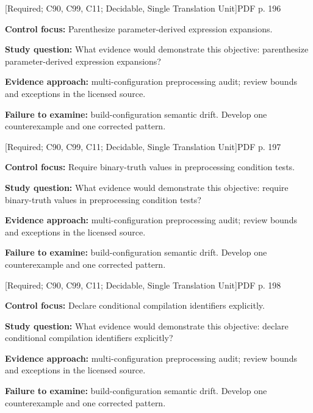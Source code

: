 \documentclass[10pt,letterpaper]{article}
\begin{document}
\smallskip
{}
 \textsf{\footnotesize [Required; C90, C99, C11; Decidable, Single Translation Unit]}\hfill{\footnotesize PDF p. 196}\par
\textbf{Control focus:} Parenthesize parameter-derived expression expansions.\par
\textbf{Study question:} What evidence would demonstrate this objective: parenthesize parameter-derived expression expansions?\par
\textbf{Evidence approach:} multi-configuration preprocessing audit; review bounds and exceptions in the licensed source.\par
\textbf{Failure to examine:} build-configuration semantic drift. Develop one counterexample and one corrected pattern.\par
\smallskip
{}
 \textsf{\footnotesize [Required; C90, C99, C11; Decidable, Single Translation Unit]}\hfill{\footnotesize PDF p. 197}\par
\textbf{Control focus:} Require binary-truth values in preprocessing condition tests.\par
\textbf{Study question:} What evidence would demonstrate this objective: require binary-truth values in preprocessing condition tests?\par
\textbf{Evidence approach:} multi-configuration preprocessing audit; review bounds and exceptions in the licensed source.\par
\textbf{Failure to examine:} build-configuration semantic drift. Develop one counterexample and one corrected pattern.\par
\smallskip
{}
 \textsf{\footnotesize [Required; C90, C99, C11; Decidable, Single Translation Unit]}\hfill{\footnotesize PDF p. 198}\par
\textbf{Control focus:} Declare conditional compilation identifiers explicitly.\par
\textbf{Study question:} What evidence would demonstrate this objective: declare conditional compilation identifiers explicitly?\par
\textbf{Evidence approach:} multi-configuration preprocessing audit; review bounds and exceptions in the licensed source.\par
\textbf{Failure to examine:} build-configuration semantic drift. Develop one counterexample and one corrected pattern.\par
\end{document}
